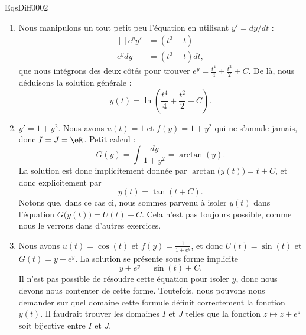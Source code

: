 
\begin{corrige}{EqsDiff0002}

\begin{enumerate}

\item
Nous manipulons un tout petit peu l'équation en utilisant $y'=dy/dt$ :
\begin{equation}
	\begin{aligned}[]
		e^yy'&=(t^3+t)\\
		e^ydy&=(t^3+t)dt,
	\end{aligned}
\end{equation}
que nous intégrons des deux côtés pour trouver $e^y=\frac{ t^4 }{ 4 }+\frac{ t^2 }{ 2 }+C$. De là, nous déduisons la solution générale :
\begin{equation}
	y(t)=\ln\left( \frac{ t^4 }{ 4 }+\frac{ t^2 }{ 2 }+C \right).
\end{equation}

\item
$y'=1+y^2$. Nous avons $u(t)=1$ et $f(y)=1+y^2$ qui ne s'annule jamais, donc $I=J=\eR$. Petit calcul :
\begin{equation}
	G(y)=\int\frac{dy}{ 1+y^2 }=\arctan(y).
\end{equation}
La solution est donc implicitement donnée par $\arctan\big( y(t) \big)=t+C$, et donc explicitement par
\begin{equation}
	y(t)=\tan(t+C).
\end{equation}
Notons que, dans ce cas ci, nous sommes parvenu à isoler $y(t)$ dans l'équation $G\big( y(t) \big)=U(t)+C$. Cela n'est pas toujours possible, comme nous le verrons dans d'autres exercices.


\item
Nous avons $u(t)=\cos(t)$ et $f(y)=\frac{1}{ 1+ e^{y} }$, et donc $U(t)=\sin(t)$ et $G(t)=y+e^y$. La solution se présente sous forme implicite
\begin{equation}
	y+e^y=\sin(t)+C.
\end{equation}
Il n'est pas possible de résoudre cette équation pour isoler $y$, donc nous devons nous contenter de cette forme. Toutefois, nous pouvons nous demander sur quel domaine cette formule définit correctement la fonction $y(t)$. Il faudrait trouver les domaines $I$ et $J$ telles que la fonction $z\mapsto z+e^z$ soit bijective entre $I$ et $J$.


\end{enumerate}
\end{corrige}
